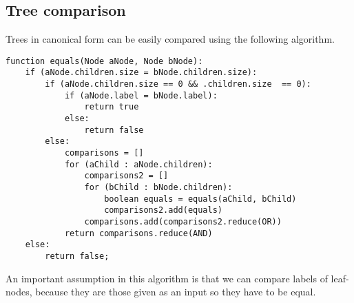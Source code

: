 \documentclass[a4paper,10pt]{article}
\begin{document}
\subsection{Tree comparison}
Trees in canonical form can be easily compared using the following algorithm.
\begin{lstlisting}[caption={Comparing trees.}]
function equals(Node aNode, Node bNode):
    if (aNode.children.size = bNode.children.size):
        if (aNode.children.size == 0 && .children.size  == 0):
            if (aNode.label = bNode.label):
                return true
            else:
                return false
        else:
            comparisons = []
            for (aChild : aNode.children):
                comparisons2 = []
                for (bChild : bNode.children):
                    boolean equals = equals(aChild, bChild)
                    comparisons2.add(equals)
                comparisons.add(comparisons2.reduce(OR))
            return comparisons.reduce(AND)
    else:
        return false;
\end{lstlisting}
An important assumption in this algorithm is that we can compare labels of leaf-nodes, because they are those given as an input so they have to be equal.
\end{document}
